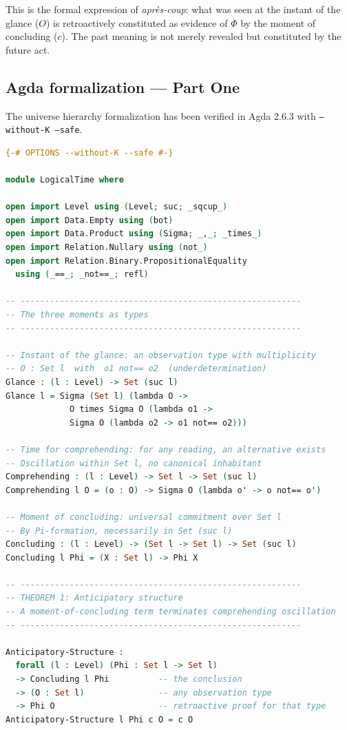\documentclass[12pt]{article}
\theoremstyle{definition}
\theoremstyle{remark}
\newcommand{\aprescoup}{\textit{apr\`es-coup}}
\begin{document}
This is the formal expression of \aprescoup{}: what was seen at the instant of the glance ($O$) is retroactively constituted as evidence of $\Phi$ by the moment of concluding ($c$). The past meaning is not merely revealed but constituted by the future act.

\subsection{Agda formalization --- Part One}

The universe hierarchy formalization has been verified in Agda 2.6.3 with \texttt{--without-K --safe}.

\begin{lstlisting}[language=Agda, caption={Core Agda formalization: logical time as universe lifting}]
{-# OPTIONS --without-K --safe #-}

module LogicalTime where

open import Level using (Level; suc; _sqcup_)
open import Data.Empty using (bot)
open import Data.Product using (Sigma; _,_; _times_)
open import Relation.Nullary using (not_)
open import Relation.Binary.PropositionalEquality
  using (_==_; _not==_; refl)

-- ---------------------------------------------------------
-- The three moments as types
-- ---------------------------------------------------------

-- Instant of the glance: an observation type with multiplicity
-- O : Set l  with  o1 not== o2  (underdetermination)
Glance : (l : Level) -> Set (suc l)
Glance l = Sigma (Set l) (lambda O ->
             O times Sigma O (lambda o1 ->
             Sigma O (lambda o2 -> o1 not== o2)))

-- Time for comprehending: for any reading, an alternative exists
-- Oscillation within Set l, no canonical inhabitant
Comprehending : (l : Level) -> Set l -> Set (suc l)
Comprehending l O = (o : O) -> Sigma O (lambda o' -> o not== o')

-- Moment of concluding: universal commitment over Set l
-- By Pi-formation, necessarily in Set (suc l)
Concluding : (l : Level) -> (Set l -> Set l) -> Set (suc l)
Concluding l Phi = (X : Set l) -> Phi X

-- ---------------------------------------------------------
-- THEOREM 1: Anticipatory structure
-- A moment-of-concluding term terminates comprehending oscillation
-- ---------------------------------------------------------

Anticipatory-Structure :
  forall (l : Level) (Phi : Set l -> Set l)
  -> Concluding l Phi          -- the conclusion
  -> (O : Set l)               -- any observation type
  -> Phi O                     -- retroactive proof for that type
Anticipatory-Structure l Phi c O = c O


\end{lstlisting}
\end{document}
